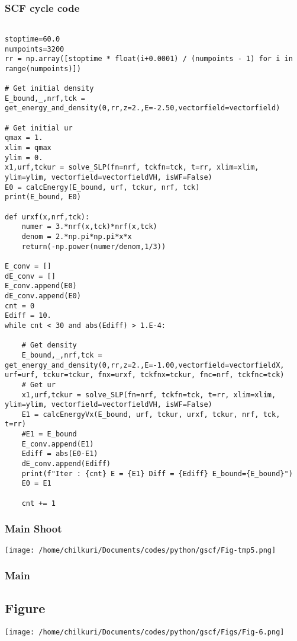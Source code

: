 \documentclass[11pt,a4paper]{article}
\begin{document}
\subsubsection{SCF cycle code}
\label{sec:org47ac654}
\begin{verbatim}

stoptime=60.0
numpoints=3200
rr = np.array([stoptime * float(i+0.0001) / (numpoints - 1) for i in range(numpoints)])

# Get initial density
E_bound,_,nrf,tck = get_energy_and_density(0,rr,z=2.,E=-2.50,vectorfield=vectorfield)

# Get initial ur
qmax = 1.
xlim = qmax
ylim = 0.
x1,urf,tckur = solve_SLP(fn=nrf, tckfn=tck, t=rr, xlim=xlim, ylim=ylim, vectorfield=vectorfieldVH, isWF=False)
E0 = calcEnergy(E_bound, urf, tckur, nrf, tck)
print(E_bound, E0)

def urxf(x,nrf,tck):
    numer = 3.*nrf(x,tck)*nrf(x,tck)
    denom = 2.*np.pi*np.pi*x*x
    return(-np.power(numer/denom,1/3))

E_conv = []
dE_conv = []
E_conv.append(E0)
dE_conv.append(E0)
cnt = 0
Ediff = 10.
while cnt < 30 and abs(Ediff) > 1.E-4:

    # Get density
    E_bound,_,nrf,tck = get_energy_and_density(0,rr,z=2.,E=-1.00,vectorfield=vectorfieldX, urf=urf, tckur=tckur, fnx=urxf, tckfnx=tckur, fnc=nrf, tckfnc=tck)
    # Get ur
    x1,urf,tckur = solve_SLP(fn=nrf, tckfn=tck, t=rr, xlim=xlim, ylim=ylim, vectorfield=vectorfieldVH, isWF=False)
    E1 = calcEnergyVx(E_bound, urf, tckur, urxf, tckur, nrf, tck, t=rr)
    #E1 = E_bound
    E_conv.append(E1)
    Ediff = abs(E0-E1)
    dE_conv.append(Ediff)
    print(f"Iter : {cnt} E = {E1} Diff = {Ediff} E_bound={E_bound}")
    E0 = E1

    cnt += 1
\end{verbatim}
\subsubsection{Main Shoot}
\label{sec:org601e5a0}
\begin{center}
\texttt{[image: /home/chilkuri/Documents/codes/python/gscf/Fig-tmp5.png]}
\end{center}

\subsubsection{Main}
\label{sec:org461cfc3}

\subsection{Figure}
\label{sec:orge35b1a7}
\begin{center}
\texttt{[image: /home/chilkuri/Documents/codes/python/gscf/Figs/Fig-6.png]}
\end{center}
\end{document}
